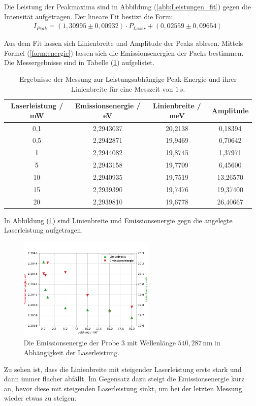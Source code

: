 Die Leistung der Peakmaxima sind in Abbildung (\ref{abb:Leistungen_fit}) gegen die Intensit\"{a}t aufgetragen.
Der lineare Fit bestizt die Form:
\begin{align*}
	I_{Peak} = (1,30995 \pm 0,00932) \cdot P_{Laser} + (0,02559 \pm 0,09654)
\end{align*}

Aus dem Fit lassen sich Linienbreite und Amplitude der Peaks ablesen.
Mittels Formel (\ref{form:energie}) lassen sich die Emissionsenergien der Paeks bestimmen.
Die Messergebnisse sind in Tabelle (\ref{tab:1c_2}) aufgelistet.
\begin{table}
	\centering
	\caption{Ergebnisse der Messung zur Leistungsabh\"{a}ngige Peak-Energie und ihrer Linienbreite f\"{u}r eine Messzeit von $1 \, s$.}
\begin{tabular}{|cccc|}
	\hline
	{Laserleistung / mW}	&	{Emissionsenergie / eV}	&	{Linienbreite / meV}	&	{Amplitude}	\\
	\hline
	0,1	&	2,2943037	&	20,2138	&	0,18394	\\
	0,5	&	2,2942871	&	19,9469	&	0,70642	\\
	1	&	2,2944082	&	19,8745	&	1,37971	\\
	5	&	2,2943158	&	19,7709	&	6,45600	\\
	10	&	2,2940935	&	19,7519	&	13,26570	\\
	15	&	2,2939390	&	19,7476	&	19,37400	\\
	20	&	2,2939810	&	19,6778	&	26,40667	\\
	\hline
	\end{tabular}
\label{tab:1c_2}
\end{table}
In Abbildung (\ref{abb:auf1c_ergebnisse}) sind Linienbreite und Emissionsenergie gegn die angelegte Laserleistung aufgetragen.
\begin{figure}[hbtp]
\centering
	\includegraphics[width=0.6\textwidth]{Plots/aufgabe1c4.pdf}
	\caption{Die Emissionsenergie der Probe 3 mit Wellenl\"{a}nge $540,287 \,$nm in Abh\"{a}ngigkeit der Laserleistung.}
	\label{abb:auf1c_ergebnisse}
\end{figure}
Zu sehen ist, dass die Linienbreite mit steigender Laserleistung erste stark und dann immer flacher abf\"{a}llt.
Im Gegensatz dazu steigt die Emissionsenergie kurz an, bevor diese mit steigenden Laserleistung sinkt, um bei der letzten Messung wieder etwas zu steigen.

